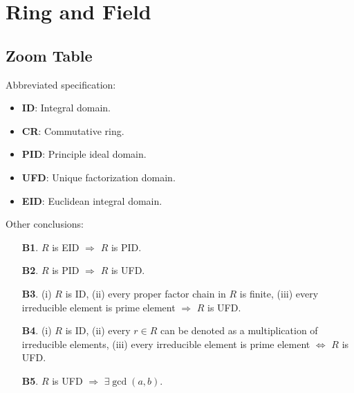 \chapter{Ring and Field}

\section{Zoom Table}

Abbreviated specification:
\begin{itemize}
    \item \textbf{ID}: Integral domain.
    \item \textbf{CR}: Commutative ring.
    \item \textbf{PID}: Principle ideal domain.
    \item \textbf{UFD}: Unique factorization domain.
    \item \textbf{EID}: Euclidean integral domain.
\end{itemize}

\begin{center}
\end{center}
Other conclusions:
\begin{enumerate}
    \item[\textbf{B1}.] $R$ is EID $\Rightarrow$ $R$ is PID.
    \item[\textbf{B2}.] $R$ is PID $\Rightarrow$ $R$ is UFD.
    \item[\textbf{B3}.] (i) $R$ is ID, (ii) every proper factor chain in $R$ is finite, (iii) every irreducible element is prime element $\Rightarrow$ $R$ is UFD. 
    \item[\textbf{B4}.] (i) $R$ is ID, (ii) every $r \in R$ can be denoted as a multiplication of irreducible elements, (iii) every irreducible element is prime element $\Leftrightarrow$ $R$ is UFD.
    \item[\textbf{B5}.] $R$ is UFD $\Rightarrow$ $\exists \gcd(a, b)$.
\end{enumerate}







